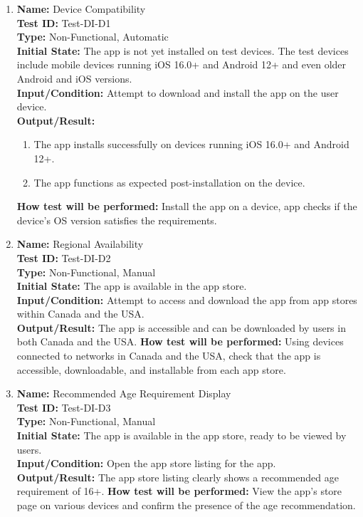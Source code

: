 \documentclass[12pt, titlepage]{article}
\begin{document}
\begin{enumerate}

  \item \textbf{Name:} Device Compatibility \label{itm:Test-DI-D1} \\
  \textbf{Test ID:} Test-DI-D1 \\
  \textbf{Type:} Non-Functional, Automatic \\
  \textbf{Initial State:} The app is not yet installed on test devices. The test devices include mobile devices running iOS 16.0+ and Android 12+ and even older Android and iOS versions. \\
  \textbf{Input/Condition:} Attempt to download and install the app on the user device. \\
  \textbf{Output/Result:}
    \begin{enumerate}
        \item The app installs successfully on devices running iOS 16.0+ and Android 12+.
        \item The app functions as expected post-installation on the device.
    \end{enumerate}
  \textbf{How test will be performed:} Install the app on a device, app checks if the device's OS version satisfies the requirements. \\

  \item \textbf{Name:} Regional Availability \label{itm:Test-DI-D2} \\
    \textbf{Test ID:} Test-DI-D2 \\
    \textbf{Type:} Non-Functional, Manual \\
    \textbf{Initial State:} The app is available in the app store. \\
    \textbf{Input/Condition:} Attempt to access and download the app from app stores within Canada and the USA. \\
    \textbf{Output/Result:} The app is accessible and can be downloaded by users in both Canada and the USA.
    \textbf{How test will be performed:} Using devices connected to networks in Canada and the USA, check that the app is accessible, downloadable, and installable from each app store. \\

  \item \textbf{Name:} Recommended Age Requirement Display \label{itm:Test-DI-D3} \\
    \textbf{Test ID:} Test-DI-D3 \\
    \textbf{Type:} Non-Functional, Manual \\
    \textbf{Initial State:} The app is available in the app store, ready to be viewed by users. \\
    \textbf{Input/Condition:} Open the app store listing for the app. \\
    \textbf{Output/Result:} The app store listing clearly shows a recommended age requirement of 16+.
    \textbf{How test will be performed:} View the app's store page on various devices and confirm the presence of the age recommendation. \\


\end{enumerate}
\end{document}
